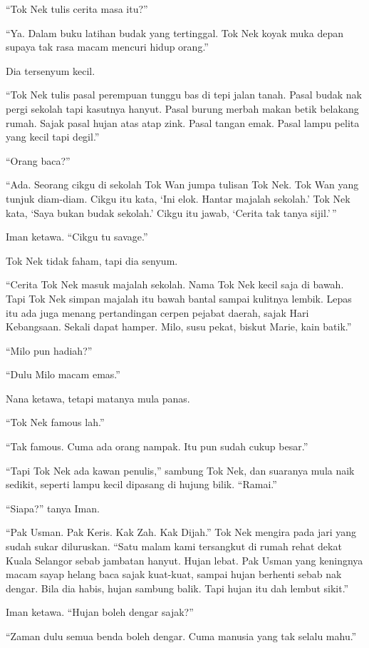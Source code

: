 \documentclass[
  11pt,
  a5paper,
  openany,
  oneside]{book}
\begin{document}
``Tok Nek tulis cerita masa itu?''

``Ya. Dalam buku latihan budak yang tertinggal. Tok Nek koyak muka depan
supaya tak rasa macam mencuri hidup orang.''

Dia tersenyum kecil.

``Tok Nek tulis pasal perempuan tunggu bas di tepi jalan tanah. Pasal
budak nak pergi sekolah tapi kasutnya hanyut. Pasal burung merbah makan
betik belakang rumah. Sajak pasal hujan atas atap zink. Pasal tangan
emak. Pasal lampu pelita yang kecil tapi degil.''

``Orang baca?''

``Ada. Seorang cikgu di sekolah Tok Wan jumpa tulisan Tok Nek. Tok Wan
yang tunjuk diam-diam. Cikgu itu kata, `Ini elok. Hantar majalah
sekolah.' Tok Nek kata, `Saya bukan budak sekolah.' Cikgu itu jawab,
`Cerita tak tanya sijil.'\,''

Iman ketawa. ``Cikgu tu savage.''

Tok Nek tidak faham, tapi dia senyum.

``Cerita Tok Nek masuk majalah sekolah. Nama Tok Nek kecil saja di
bawah. Tapi Tok Nek simpan majalah itu bawah bantal sampai kulitnya
lembik. Lepas itu ada juga menang pertandingan cerpen pejabat daerah,
sajak Hari Kebangsaan. Sekali dapat hamper. Milo, susu pekat, biskut
Marie, kain batik.''

``Milo pun hadiah?''

``Dulu Milo macam emas.''

Nana ketawa, tetapi matanya mula panas.

``Tok Nek famous lah.''

``Tak famous. Cuma ada orang nampak. Itu pun sudah cukup besar.''

``Tapi Tok Nek ada kawan penulis,'' sambung Tok Nek, dan suaranya mula
naik sedikit, seperti lampu kecil dipasang di hujung bilik. ``Ramai.''

``Siapa?'' tanya Iman.

``Pak Usman. Pak Keris. Kak Zah. Kak Dijah.'' Tok Nek mengira pada jari
yang sudah sukar diluruskan. ``Satu malam kami tersangkut di rumah rehat
dekat Kuala Selangor sebab jambatan hanyut. Hujan lebat. Pak Usman yang
keningnya macam sayap helang baca sajak kuat-kuat, sampai hujan berhenti
sebab nak dengar. Bila dia habis, hujan sambung balik. Tapi hujan itu
dah lembut sikit.''

Iman ketawa. ``Hujan boleh dengar sajak?''

``Zaman dulu semua benda boleh dengar. Cuma manusia yang tak selalu
mahu.''
\end{document}
